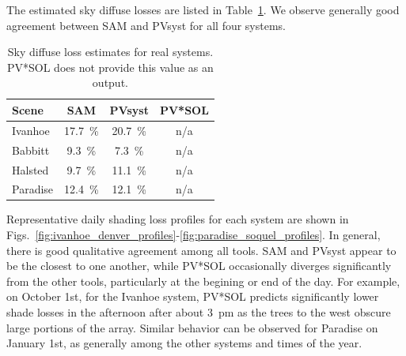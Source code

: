 \documentclass[twocolumn,10pt]{asme2ej}
\begin{document}
The estimated sky diffuse losses are listed in Table~\ref{tab:diffuse_loss_systems}.  We observe generally good agreement between SAM and PVsyst for all four systems.

\begin{table}[h!]
\begin{center}
\begin{tabular}{lccc}
Scene & SAM & PVsyst & PV*SOL \\
\hline
Ivanhoe & 17.7~\% & 20.7~\% & n/a \\
Babbitt  & 9.3~\% & 7.3~\% & n/a \\
Halsted  & 9.7~\% & 11.1~\% & n/a \\
Paradise & 12.4~\% & 12.1~\% & n/a \\
\end{tabular}
\caption{Sky diffuse loss estimates for real systems.  PV*SOL does not provide this value as an output.}
\label{tab:diffuse_loss_systems}
\end{center}
\end{table}


Representative daily shading loss profiles for each system are shown in Figs.~\ref{fig:ivanhoe_denver_profiles}-\ref{fig:paradise_soquel_profiles}.  In general, there is good qualitative agreement among all tools.  SAM and PVsyst appear to be the closest to one another, while PV*SOL occasionally diverges significantly from the other tools, particularly at the begining or end of the day.  For example, on October 1st, for the Ivanhoe system, PV*SOL predicts significantly lower shade losses in the afternoon after about 3~pm as the trees to the west obscure large portions of the array.  Similar behavior can be observed for Paradise on January 1st, as generally among the other systems and times of the year.  
\end{document}
